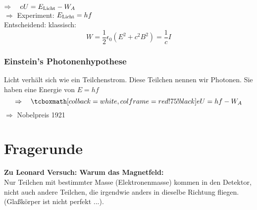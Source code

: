 \\
$ \Rightarrow \quad e U = E_{\textrm{Licht}} - W_A $\\[5pt]
$ \Rightarrow $ Experiment: $ E_{\textrm{Licht}} = h f $\\[5pt]
Entscheidend: klassisch:
\begin{equation*}
W = \frac{1}{2} \epsilon_0 (E^2 + c^2 B^2) = \frac{1}{c} I
\end{equation*}

\subsubsection{Einstein's Photonenhypothese}

Licht verhält sich wie ein Teilchenstrom. Diese Teilchen nennen wir Photonen. Sie haben eine Energie von $ E = h f $
\begin{equation*}
\Rightarrow \quad \rmbox{e U = h f - W_A}
\end{equation*}
$ \Rightarrow $ Nobelpreis 1921

\section*{Fragerunde}


\textbf{Zu Leonard Versuch: Warum das Magnetfeld:}\\
Nur Teilchen mit bestimmter Masse (Elektronenmasse) kommen in den Detektor, nicht auch andere Teilchen, die irgendwie anders in dieselbe Richtung fliegen. (Glaßkörper ist nicht perfekt ...).\\[5pt]